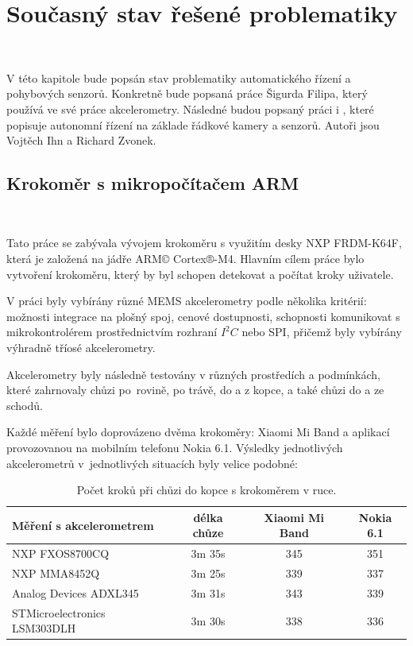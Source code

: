 \chapter{Současný stav řešené problematiky}
\label{sec:Theory}\

V této kapitole bude popsán stav problematiky automatického řízení a pohybových
senzorů. Konkretně bude popsaná práce \cite{krokomer} Šigurda Filipa, který používá ve své práce akcelerometry. Následné
budou popsaný práci \cite{draha} i \cite{robot},
které popisuje autonomní řízení na základe řádkové kamery a senzorů. Autoři jsou
Vojtěch Ihn a Richard Zvonek.

\section{Krokoměr s mikropočítačem ARM}\

Tato práce se zabývala vývojem krokoměru s využitím desky NXP FRDM-K64F, která je
založená na jádře ARM© Cortex®-M4. Hlavním cílem práce bylo vytvoření krokoměru,
který by byl schopen detekovat a počítat kroky uživatele.

V práci byly vybírány různé MEMS akcelerometry podle několika kritérií: možnosti
integrace na plošný spoj, cenové dostupnosti, schopnosti komunikovat s
mikrokontrolérem prostřednictvím rozhraní $I^2C$ nebo SPI, přičemž byly vybírány
výhradně tříosé akcelerometry.

Akcelerometry byly následně testovány v různých prostředích a podmínkách, které
zahrnovaly chůzi po~rovině, po trávě, do a z kopce, a také chůzi do a ze schodů.

Každé měření bylo doprovázeno dvěma krokoměry:  Xiaomi Mi Band a aplikací
 provozovanou na mobilním telefonu Nokia 6.1. Výsledky jednotlivých
akcelerometrů v~jednotlivých situacích byly velice podobné:

\begin{table}[!h]
	\centering
	\begin{tabular}{lccc}
		\toprule
		Měření s akcelerometrem      & délka chůze & Xiaomi Mi Band & Nokia 6.1 \\
		\midrule
		NXP FXOS8700CQ               & 3m 35s      & 345            & 351       \\
		NXP MMA8452Q                 & 3m 25s      & 339            & 337       \\
		Analog Devices ADXL345       & 3m 31s      & 343            & 339       \\
		STMicroelectronics LSM303DLH & 3m 30s      & 338            & 336       \\
		\bottomrule
	\end{tabular}
	\caption{Počet kroků při chůzi do kopce s krokoměrem v ruce\cite{krokomer}.}
	\label{tab:1}
\end{table}

